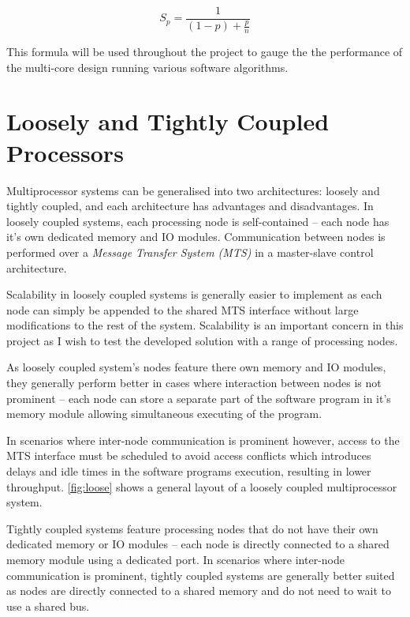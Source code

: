 \begin{equation}
S_{p} = \frac{1}{(1-p)+\frac{p}{n}}
\label{eq:amdahl}
\end{equation}

This formula will be used throughout the project to gauge the the performance of the multi-core design running various software algorithms.

\section{Loosely and Tightly Coupled Processors}
Multiprocessor systems can be generalised into two architectures: loosely and tightly coupled, and each architecture has advantages and disadvantages. 
In loosely coupled systems, each processing node is self-contained -- each node has it's own dedicated memory and IO modules. Communication between nodes is performed over a \textit{Message Transfer System (MTS)} \cite{preeti_aritra_2017}  in a master-slave control architecture.

Scalability in loosely coupled systems is generally easier to implement as each node can simply be appended to the shared MTS interface without large modifications to the rest of the system. Scalability is an important concern in this project as I wish to test the developed solution with a range of processing nodes.

As loosely coupled system's nodes feature there own memory and IO modules, they generally perform better in cases where interaction between nodes is not prominent -- each node can store a separate part of the software program in it's memory module allowing simultaneous executing of the program.

In scenarios where inter-node communication is prominent however, access to the MTS interface must be scheduled to avoid access conflicts which introduces delays and idle times in the software programs execution, resulting in lower throughput. \cref{fig:loose} shows a general layout of a loosely coupled multiprocessor system.

Tightly coupled systems feature processing nodes that do not have their own dedicated memory or IO modules -- each node is directly connected to a shared memory module using a dedicated  port. In scenarios where inter-node communication is prominent, tightly coupled systems are generally better suited as nodes are directly connected to a shared memory and do not need to wait to use a shared bus.

